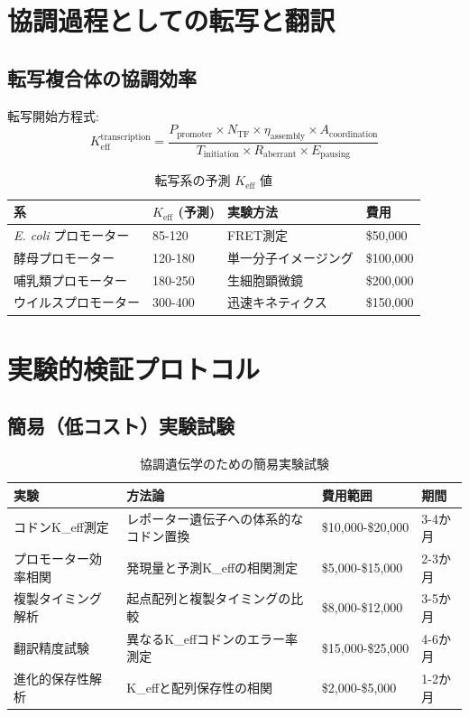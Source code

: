 \documentclass[12pt]{article}
\begin{document}
	\section{協調過程としての転写と翻訳}
	
	\subsection{転写複合体の協調効率}
	
	転写開始方程式:
	\[
	K_{\text{eff}}^{\text{transcription}} = \frac{P_{\text{promoter}} \times N_{\text{TF}} \times \eta_{\text{assembly}} \times A_{\text{coordination}}}{T_{\text{initiation}} \times R_{\text{aberrant}} \times E_{\text{pausing}}}
	\]
	
	\begin{table}[H]
		\centering
		\caption{転写系の予測 $K_{\text{eff}}$ 値}
		\footnotesize
		\begin{tabular}{p{4cm} p{3cm} p{4cm} p{3cm}}
			\toprule
			\textbf{系} & \textbf{$K_{\text{eff}}$ (予測)} & \textbf{実験方法} & \textbf{費用} \\
			\midrule
			\textit{E. coli} プロモーター & 85-120 & FRET測定 & \$50,000 \\
			酵母プロモーター & 120-180 & 単一分子イメージング & \$100,000 \\
			哺乳類プロモーター & 180-250 & 生細胞顕微鏡 & \$200,000 \\
			ウイルスプロモーター & 300-400 & 迅速キネティクス & \$150,000 \\
			\bottomrule
		\end{tabular}
	\end{table}
	
	\section{実験的検証プロトコル}
	
	\subsection{簡易（低コスト）実験試験}
	
	\begin{table}[H]
		\centering
		\caption{協調遺伝学のための簡易実験試験}
		\footnotesize
		\begin{tabular}{p{3.5cm} p{5cm} p{3cm} p{2cm}}
			\toprule
			\textbf{実験} & \textbf{方法論} & \textbf{費用範囲} & \textbf{期間} \\
			\midrule
			コドンK\_eff測定 & レポーター遺伝子への体系的なコドン置換 & \$10,000-\$20,000 & 3-4か月 \\
			プロモーター効率相関 & 発現量と予測K\_effの相関測定 & \$5,000-\$15,000 & 2-3か月 \\
			複製タイミング解析 & 起点配列と複製タイミングの比較 & \$8,000-\$12,000 & 3-5か月 \\
			翻訳精度試験 & 異なるK\_effコドンのエラー率測定 & \$15,000-\$25,000 & 4-6か月 \\
			進化的保存性解析 & K\_effと配列保存性の相関 & \$2,000-\$5,000 & 1-2か月 \\
			\bottomrule
		\end{tabular}
	\end{table}
	
\end{document}
